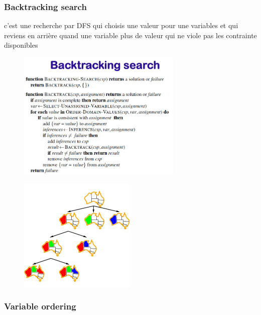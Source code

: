 		\subsubsection{Backtracking search}
			c'est une recherche par DFS qui choisis une valeur pour une variables et qui reviens en arrière quand une variable plus de valeur qui ne viole pas les contrainte disponibles
		
			\begin{figure}[htp]
				\centering
				\includegraphics[width=0.7\textwidth]{img/backtrackingSearch.png}

			\end{figure}
			
			\vfill
			
			\begin{figure}[htp]
				\centering
				\includegraphics[width=0.5\textwidth]{img/exempleBTS.png}

			\end{figure}
			
		\subsubsection{Variable ordering}
	
